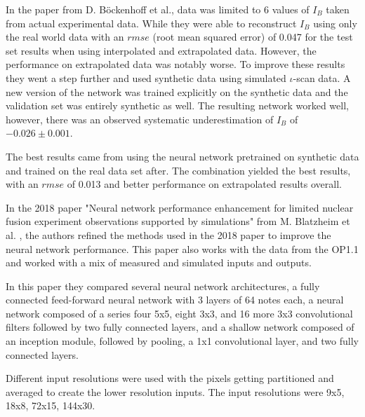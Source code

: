 In the paper from D. Böckenhoff et al., data was limited to 6 values of $I_B$ taken from actual experimental data. While they were able to reconstruct $I_B$ using only the real world data with an $rmse$ (root mean squared error) of 0.047 for the test set results when using interpolated and extrapolated data. However, the performance on extrapolated data was notably worse. To improve these results they went a step further and used synthetic data using simulated $\iota$-scan data. A new version of the network was trained explicitly on the synthetic data and the validation set was entirely synthetic as well. The resulting network worked well, however, there was an observed systematic underestimation of $I_B$ of $-0.026 \pm 0.001$.

The best results came from using the neural network pretrained on synthetic data and trained on the real data set after. The combination yielded the best results, with an $rmse$ of 0.013 and better performance on extrapolated results overall.

In the 2018 paper "Neural network performance enhancement for limited nuclear fusion experiment observations supported by simulations" from M. Blatzheim et al. \cite{Blatzheim_2019}, the authors refined the methods used in the 2018 paper to improve the neural network performance. This paper also works with the data from the OP1.1 and worked with a mix of measured and simulated inputs and outputs.

In this paper they compared several neural network architectures, a fully connected feed-forward neural network with 3 layers of 64 notes each, a neural network composed of a series four 5x5, eight 3x3, and 16 more 3x3 convolutional filters followed by two fully connected layers, and a shallow network composed of an inception module, followed by pooling, a 1x1 convolutional layer, and two fully connected layers.

Different input resolutions were used with the pixels getting partitioned and averaged to create the lower resolution inputs. The input resolutions were 9x5, 18x8, 72x15, 144x30.